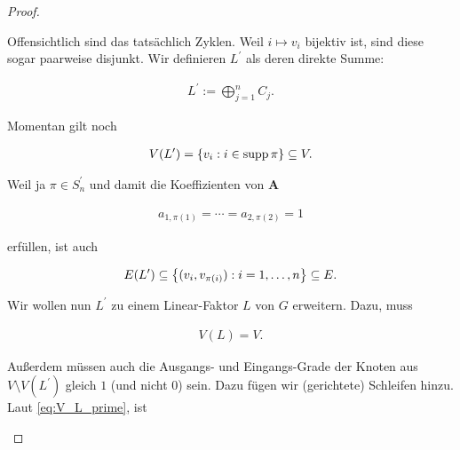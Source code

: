 \begin{proof}
\begin{enumerate}[label = \arabic*.]
                    Offensichtlich sind das tatsächlich Zyklen.
                    Weil $i \mapsto v_i$ bijektiv ist, sind diese sogar paarweise disjunkt.
                    Wir definieren $L^\prime$ als deren direkte Summe:

                    \begin{align*}
                        L^\prime
                        :=
                        \bigoplus_{j=1}^n C_j.
                    \end{align*}

                    Momentan gilt noch

                    \begin{align} \label{eq:V_L_prime}
                        V(L^\prime)
                        =
                        {\left \{ v_i: i \in \operatorname{supp} \pi \right \}}
                        \subseteq
                        V.
                    \end{align}

                    Weil ja $\pi \in S_n^\prime$ und damit die Koeffizienten von $\mathbf A$

                    \begin{align*}
                        a_{1, \pi(1)} = \cdots = a_{2, \pi(2)} = 1
                    \end{align*}

                    erfüllen, ist auch

                    \begin{align} \label{eq:E_L_prime}
                        E(L^\prime)
                        \subseteq
                        {\left \{ (v_i, v_{\pi(i)}): i = 1, \dots, n \right \}}
                        \subseteq
                        E.
                    \end{align}

                    Wir wollen nun $L^\prime$ zu einem Linear-Faktor $L$ von $G$ erweitern.
                    Dazu, muss

                    \begin{align*}
                        V(L) = V.
                    \end{align*}

                    Außerdem müssen auch die Ausgangs- und Eingangs-Grade der Knoten aus $V \setminus V(L^\prime)$ gleich $1$ (und nicht $0$) sein.
                    Dazu fügen wir (gerichtete) Schleifen hinzu.
                    Laut \eqref{eq:V_L_prime}, ist


\end{enumerate}
\end{proof}
